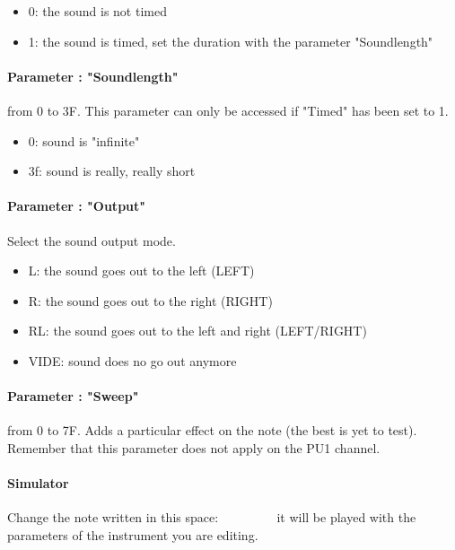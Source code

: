 \begin{itemize}
    \item{0: the sound is not timed}
    \item{1: the sound is timed, set the duration with the parameter "Soundlength"}
\end{itemize}

\paragraph{Parameter : "Soundlength"} from 0 to 3F.
This parameter can only be accessed if "Timed" has been set to 1.
\medskip

\begin{itemize}
    \item{0: sound is "infinite"}
    \item{3f: sound is really, really short}
\end{itemize}

\paragraph{Parameter : "Output"} Select the sound output mode.
\medskip

\begin{itemize}
    \item{L: the sound goes out to the left (LEFT)}
    \item{R: the sound goes out to the right (RIGHT)}
    \item{RL: the sound goes out to the left and right (LEFT/RIGHT)}
    \item{VIDE: sound does no go out anymore}
\end{itemize}

\paragraph{Parameter : "Sweep"} from 0 to 7F.
Adds a particular effect on the note (the best is yet to test).
Remember that this parameter does not apply on the PU1 channel.

\paragraph{Simulator} Change the note written in this space:
         it will be played with the parameters of the instrument you are editing.
